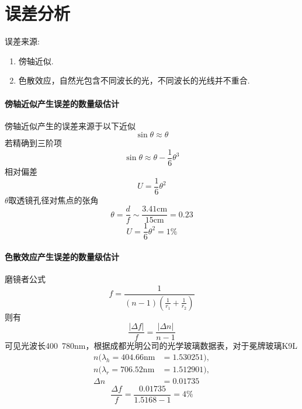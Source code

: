 \documentclass[UTF8]{gapd}
\begin{document}
\section{误差分析}
误差来源:
\begin{enumerate}
  \item 傍轴近似.
  \item 色散效应，自然光包含不同波长的光，不同波长的光线并不重合.
\end{enumerate}
\paragraph{傍轴近似产生误差的数量级估计}
傍轴近似产生的误差来源于以下近似
\begin{equation}
  \sin\theta \approx \theta
\end{equation}
若精确到三阶项
\begin{equation}
  \sin\theta \approx \theta -\frac{1}{6}\theta ^3 
\end{equation}
相对偏差
\begin{equation}
  U=\frac{1}{6}\theta ^2 
\end{equation}
$\theta$取透镜孔径对焦点的张角
\begin{equation}
  \theta=\frac{d}{f} \sim \frac{3.41\mathrm{cm} }{15\mathrm{cm} }= 0.23
\end{equation}
\begin{equation}
  U=\frac{1}{6}\theta ^2=1\%
\end{equation}
\paragraph{色散效应产生误差的数量级估计}
磨镜者公式
\begin{equation}
  f=\frac{1}{(n-1)(\frac{1}{r_1}+\frac{1}{r_2}  )} 
\end{equation}
则有
\begin{equation}
  \frac{|\Delta f|}{f} =\frac{|\Delta n|}{n-1} 
\end{equation}
可见光波长400~780nm，根据成都光明公司的光学玻璃数据表，对于冕牌玻璃K9L
\begin{align*}
  n(\lambda_h=404.66\mathrm{nm} &=1.530251),\\
  n(\lambda_r=706.52\mathrm{nm} &=1.512901),\\
  \Delta n&=0.01735
\end{align*}
\begin{equation}
  \frac{\Delta f}{f}=\frac{0.01735}{1.5168-1}=4\%  
\end{equation}
\end{document}
